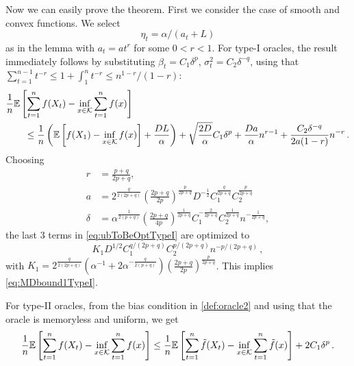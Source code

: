 Now we can easily prove the theorem.
First we consider the case of smooth and convex functions. We select $$\eta_t = \alpha/(a_t+L)$$ as in the lemma with 
$a_t=a t^r$ for some $0<r<1$. For type-I oracles, the result immediately follows by substituting $\beta_t = C_1\delta^p$, $\sigma^2_t = C_2 \delta^{-q}$, using that $\sum_{t=1}^{n-1} t^{-r} \le 1 +\int_1^n t^{-r} \le n^{1-r}/(1-r)$:
\begin{align}
\MoveEqLeft
\frac{1}{n} \EE{ \sum_{t=1}^n f( X_t) - \inf_{x \in \cK} \sum_{t=1}^n f(x)} \nonumber \\
&\le \frac{1}{n}\left(\EE{f(X_1)-\inf_{x \in \cK}f(x)}+\frac{DL}{\alpha}  \right) +\sqrt{\dfrac{2D}{\alpha}} C_1\delta^p
+\frac{Da}{\alpha} n^{r-1}+\dfrac{C_2 \delta^{-q}}{2a(1-r)}n^{-r} \,.
\label{eq:ubToBeOptTypeI}
 \end{align}
 Choosing 
 \begin{align*}
 r &= \tfrac{p+q}{2p+q},  \\
 a &= 2^{\frac{q}{2(2p+q)}}\left(\tfrac{2p+q}{2p}\right)^{\frac{p}{2p+q}} D^{-\frac{1}{2}} C_1^{\frac{q}{2p+q}} C_2^{\frac{p}{2p+q}} \\
 \delta &= \alpha^{\frac{1}{2(p+q)}}\left(\tfrac{2p+q}{4p}\right)^{\frac{1}{2p+q}} C_1^{-\frac{2}{2p+q}} C_2^{\frac{1}{2p+q}}n^{-\frac{1}{2p+q}},
 \end{align*}
the last $3$ terms in \eqref{eq:ubToBeOptTypeI} are optimized to
 \[
 K_1 D^{1/2} C_1^{q/(2p+q)} C_2^{p/(2p+q)} n ^{-p/(2p+q)} \,,
 \]
 with
 $K_1 = 2^{\frac{q}{2(2p+q)}} \left( \alpha^{-1}+2\alpha^{-\frac{q}{2(p+q)}} \right) \left( \frac{2p+q}{2p} \right)^{\frac{p}{2p+q}}$. This implies \eqref{eq:MDbound1TypeI}.

For type-II oracles, from the bias condition in \cref{def:oracle2} and using that the oracle is memoryless and uniform, we get
\begin{align*}
 \frac{1}{n} \mathbb{E}\left[ \sum_{t=1}^n f(X_t) - \inf_{x \in \mathcal{K}}\sum_{t=1}^n f(x) \right]
 \le \frac{1}{n}\mathbb{E}\left[ \sum_{t=1}^n \tilde{f}(X_t) - \inf_{x \in \mathcal{K}}\sum_{t=1}^n \tilde{f}(x) \right] +2C_1 \delta^p
 \,.
\end{align*}

